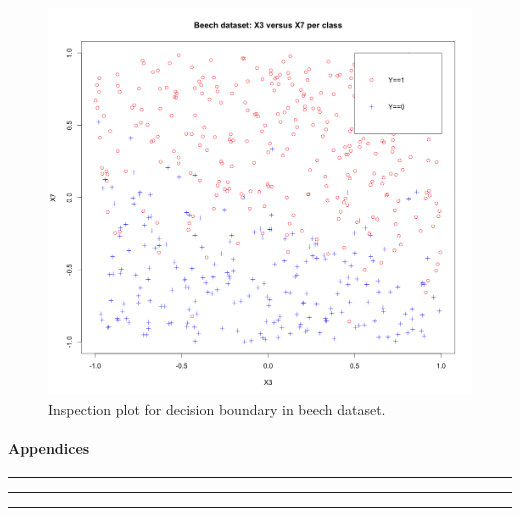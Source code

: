 \documentclass{article}
\begin{document}
\begin{figure}[h!]
  \includegraphics[width=\linewidth]{project/images/02-beech.png}
  \caption{Inspection plot for decision boundary in beech dataset.}
  \label{fig:01-beech}
\end{figure}

\newpage

\paragraph{Appendices}



\rule{\textwidth}{1pt}



\rule{\textwidth}{1pt}

\newpage



\rule{\textwidth}{1pt}
\end{document}
